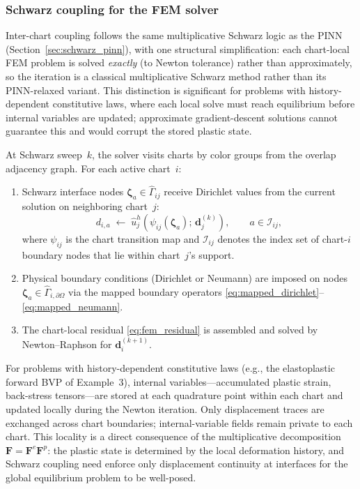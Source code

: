 \documentclass[sort&compress]{svjour3} %
\begin{document}
\subsubsection{Schwarz coupling for the FEM solver}

Inter-chart coupling follows the same multiplicative Schwarz logic as the PINN (Section~\ref{sec:schwarz_pinn}), with one structural simplification: each chart-local FEM problem is solved \emph{exactly} (to Newton tolerance) rather than approximately, so the iteration is a classical multiplicative Schwarz method \citep{quarteroni1999domain} rather than its PINN-relaxed variant. This distinction is significant for problems with history-dependent constitutive laws, where each local solve must reach equilibrium before internal variables are updated; approximate gradient-descent solutions cannot guarantee this and would corrupt the stored plastic state.

At Schwarz sweep~$k$, the solver visits charts by color groups from the overlap adjacency graph. For each active chart~$i$:
\begin{enumerate}
\item Schwarz interface nodes $\boldsymbol{\zeta}_a \in \widehat{\Gamma}_{ij}$ receive Dirichlet values from the current solution on neighboring chart~$j$:
\begin{equation}
d_{i,a} \;\leftarrow\; \widehat{u}_j^h\!\left(\psi_{ij}(\boldsymbol{\zeta}_a);\,\mathbf{d}_j^{(k)}\right),
\qquad a \in \mathcal{I}_{ij},
\label{eq:fem_schwarz_bc}
\end{equation}
where $\psi_{ij}$ is the chart transition map and $\mathcal{I}_{ij}$ denotes the index set of chart-$i$ boundary nodes that lie within chart~$j$'s support.
\item Physical boundary conditions (Dirichlet or Neumann) are imposed on nodes $\boldsymbol{\zeta}_a \in \widehat{\Gamma}_{i,\partial\Omega}$ via the mapped boundary operators \eqref{eq:mapped_dirichlet}--\eqref{eq:mapped_neumann}.
\item The chart-local residual \eqref{eq:fem_residual} is assembled and solved by Newton--Raphson for $\mathbf{d}_i^{(k+1)}$.
\end{enumerate}
For problems with history-dependent constitutive laws (e.g., the elastoplastic forward BVP of Example~3), internal variables---accumulated plastic strain, back-stress tensors---are stored at each quadrature point within each chart and updated locally during the Newton iteration. Only displacement traces are exchanged across chart boundaries; internal-variable fields remain private to each chart. This locality is a direct consequence of the multiplicative decomposition $\mathbf{F}=\mathbf{F}^e\mathbf{F}^p$: the plastic state is determined by the local deformation history, and Schwarz coupling need enforce only displacement continuity at interfaces for the global equilibrium problem to be well-posed.
\end{document}
